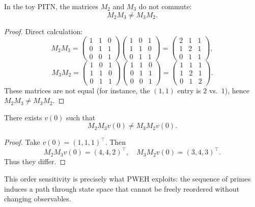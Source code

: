 \documentclass[11pt]{article}
\begin{document}
\begin{lemma}
In the toy PITN, the matrices \(M_2\) and \(M_3\) do not commute:
\[
  M_2 M_3 \neq M_3 M_2.
\]
\end{lemma}

\begin{proof}
Direct calculation:
\[
  M_2 M_3 =
  \begin{pmatrix}
  1 & 1 & 0 \\
  0 & 1 & 1 \\
  0 & 0 & 1
  \end{pmatrix}
  \begin{pmatrix}
  1 & 0 & 1 \\
  1 & 1 & 0 \\
  0 & 1 & 1
  \end{pmatrix}
  =
  \begin{pmatrix}
  2 & 1 & 1 \\
  1 & 2 & 1 \\
  0 & 1 & 1
  \end{pmatrix},
\]
\[
  M_3 M_2 =
  \begin{pmatrix}
  1 & 0 & 1 \\
  1 & 1 & 0 \\
  0 & 1 & 1
  \end{pmatrix}
  \begin{pmatrix}
  1 & 1 & 0 \\
  0 & 1 & 1 \\
  0 & 0 & 1
  \end{pmatrix}
  =
  \begin{pmatrix}
  1 & 1 & 1 \\
  1 & 2 & 1 \\
  0 & 1 & 2
  \end{pmatrix}.
\]
These matrices are not equal (for instance, the \((1,1)\) entry is \(2\) vs.\ \(1\)), hence \(M_2 M_3 \neq M_3 M_2\).
\end{proof}

\begin{corollary}
There exists \(v(0)\) such that
\[
  M_2 M_3 v(0) \neq M_3 M_2 v(0).
\]
\end{corollary}

\begin{proof}
Take \(v(0) = (1,1,1)^\top\).
Then
\[
  M_2 M_3 v(0) = (4,4,2)^\top,\quad
  M_3 M_2 v(0) = (3,4,3)^\top.
\]
Thus they differ.
\end{proof}

This order sensitivity is precisely what PWEH exploits: the sequence of primes induces a path through state space that cannot be freely reordered without changing observables.
\end{document}
